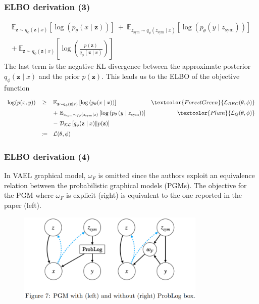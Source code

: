 \documentclass[10pt,xcolor={dvipsnames}]{beamer}
\begin{document}
\begin{frame}
    \frametitle{ELBO derivation (3)}
    \begin{multline*}
        \mathbb{E}_{\mathbf{z} \sim q_{\phi}(\mathbf{z} \mid x)}\left[\log \left(p_{\theta}(x \mid \mathbf{z})\right)\right] ~
        + ~ \mathbb{E}_{z_{\text {sym}} \sim q_{\phi}\left(z_{\text {sym}} \mid x\right)}\left[\log \left(p_{\theta}\left(y \mid z_{\text {sym}}\right)\right)\right]\\
        + ~ \mathbb{E}_{\mathbf{z} \sim q_{\phi}(\mathbf{z} \mid x)}\left[\log \left(\frac{p(\mathbf{z})}{q_{\phi}(\mathbf{z} \mid x)}\right)\right]
    \end{multline*}
    The last term is the negative KL divergence between the approximate posterior $q_{\phi}(\mathbf{z} \mid x)$ and the prior $p(\mathbf{z})$.
    This leads us to the ELBO of the objective function
    $$
    \def\arraystretch{1.5}
    \begin{array}{lclr}
        \log (p(x, y)) & \geq & \mathbb{E}_{\mathbf{z} \sim q_{\phi}(\mathbf{z} \mid x)}\left[\log \left(p_{\theta}(x \mid \mathbf{z})\right)\right] & \textcolor{ForestGreen}{\mathcal{L}_{R E C}(\theta, \phi)}\\
        & & + ~ \mathbb{E}_{z_{\text {sym}} \sim q_{\phi}\left(z_{\text {sym}} \mid x\right)}\left[\log \left(p_{\theta}\left(y \mid z_{\text {sym}}\right)\right)\right] & \textcolor{Plum}{\mathcal{L}_{Q}(\theta, \phi)}\\
        & & - ~ \mathcal{D}_{\mathcal{K} \mathcal{L}}\left[q_{\phi}(\mathbf{z} \mid x) \| p(\mathbf{z})\right] \\
        & :=  & \mathcal{L}(\theta, \phi)
    \end{array}
    $$
\end{frame}


\begin{frame}
    \frametitle{ELBO derivation (4)}
    In VAEL graphical model, $\omega_{F}$ is omitted since the authors exploit an equivalence relation between the probabilistic graphical models (PGMs). The objective for the PGM where $\omega_{F}$ is explicit (right) is equivalent to the one reported in the paper (left).

    \begin{figure}[htb]
        \centering
        \includegraphics[width=0.8\textwidth]{figures/pgms.png}
        \label{fig:pgms}
    \end{figure}
\end{frame}
\end{document}
